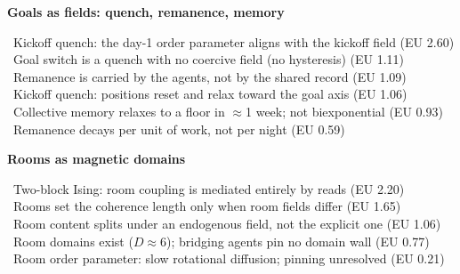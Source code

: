 






\begin{frame}
\vfill{\Large\bfseries Goals as fields: quench, remanence, memory}\par\vspace{0.8em}
{\small
{}\ Kickoff quench: the day-1 order parameter aligns with the kickoff field {\color{muted}(EU 2.60)}\\[0.25em]
\ Goal switch is a quench with no coercive field (no hysteresis) {\color{muted}(EU 1.11)}\\[0.25em]
\ Remanence is carried by the agents, not by the shared record {\color{muted}(EU 1.09)}\\[0.25em]
\ Kickoff quench: positions reset and relax toward the goal axis {\color{muted}(EU 1.06)}\\[0.25em]
\ Collective memory relaxes to a floor in $\approx$1 week; not biexponential {\color{muted}(EU 0.93)}\\[0.25em]
\ Remanence decays per unit of work, not per night {\color{muted}(EU 0.59)}}
\vfill
\end{frame}






\begin{frame}
\vfill{\Large\bfseries Rooms as magnetic domains}\par\vspace{0.8em}
{\small
{}\ Two-block Ising: room coupling is mediated entirely by reads {\color{muted}(EU 2.20)}\\[0.25em]
\ Rooms set the coherence length only when room fields differ {\color{muted}(EU 1.65)}\\[0.25em]
\ Room content splits under an endogenous field, not the explicit one {\color{muted}(EU 1.06)}\\[0.25em]
\ Room domains exist ($D\approx6$); bridging agents pin no domain wall {\color{muted}(EU 0.77)}\\[0.25em]
\ Room order parameter: slow rotational diffusion; pinning unresolved {\color{muted}(EU 0.21)}}
\vfill
\end{frame}





